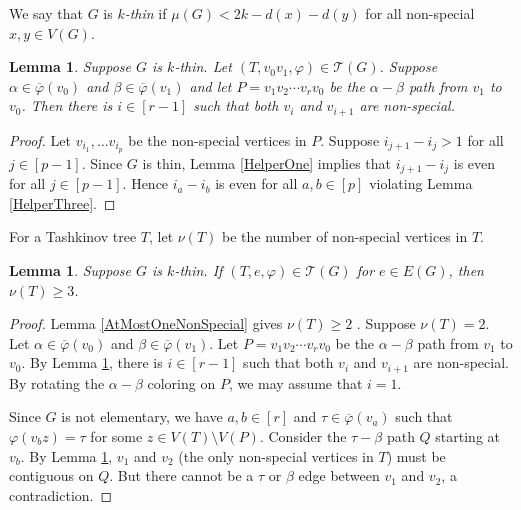 \documentclass[12pt]{amsart}
\theoremstyle{plain}
\newtheorem{lem}[thm]{Lemma}
\theoremstyle{definition}
\theoremstyle{remark}
\newcommand{\fancy}[1]{\mathcal{#1}}
\newcommand{\T}{\fancy{T}}
\newcommand{\irange}[1]{\left[#1\right]}
\newcommand{\vph}{\varphi}
\newcommand{\vphn}{\overline{\varphi}}
\begin{document}
We say that $G$ is \emph{$k$-thin} if $\mu(G) < 2k - d(x) - d(y)$ for all non-special $x,y \in V(G)$.
\begin{lem}\label{HelperFour}
Suppose $G$ is $k$-thin. Let $(T, v_0v_1, \vph) \in \T(G)$. Suppose $\alpha \in \vphn(v_0)$ and $\beta \in \vphn(v_1)$ and let $P = v_1v_2\cdots v_rv_0$ be the $\alpha-\beta$ path from $v_1$ to $v_0$.  Then there
is $i \in \irange{r-1}$ such that both $v_i$ and $v_{i+1}$ are non-special.
\end{lem}
\begin{proof}
Let $v_{i_1}, \ldots v_{i_p}$ be the non-special vertices in $P$.
Suppose $i_{j+1} - i_j > 1$ for all $j \in \irange{p-1}$. Since $G$ is thin, Lemma \ref{HelperOne} implies that $i_{j+1} - i_j$ is even for all $j \in \irange{p-1}$.  
Hence $i_a - i_b$ is even for all $a,b \in \irange{p}$ violating Lemma \ref{HelperThree}.
\end{proof}


For a Tashkinov tree $T$, let $\nu(T)$ be the number of non-special vertices in $T$.
\begin{lem}\label{HelperFive}
Suppose $G$ is $k$-thin. If $(T, e, \vph) \in \T(G)$ for $e \in E(G)$, then $\nu(T) \ge 3$.
\end{lem}
\begin{proof}
Lemma \ref{AtMostOneNonSpecial} gives $\nu(T) \ge 2$ .  Suppose $\nu(T) = 2$.  
Let $\alpha \in \vphn(v_0)$ and $\beta \in \vphn(v_1)$.  Let $P = v_1v_2\cdots v_rv_0$ be the $\alpha-\beta$ path from $v_1$ to $v_0$.
By Lemma \ref{HelperFour}, there is $i \in \irange{r-1}$ such that both $v_i$ and $v_{i+1}$ are non-special.  By rotating the $\alpha-\beta$ coloring on $P$, we may assume that $i=1$.

Since $G$ is not elementary, we have $a,b \in \irange{r}$ and $\tau \in \vphn(v_a)$ such that $\vph(v_bz) = \tau$ for some $z \in V(T) \setminus V(P)$.  
Consider the $\tau-\beta$ path $Q$ starting at $v_b$.  By Lemma \ref{HelperFour}, $v_1$ and $v_2$ (the only non-special vertices in $T$) must be contiguous on $Q$.  
But there cannot be a $\tau$ or $\beta$ edge between $v_1$ and $v_2$, a contradiction.
\end{proof}
\end{document}
